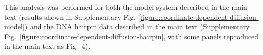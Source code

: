 \documentclass[aps,prl,twocolumn,superscriptaddress,floatfix]{revtex4-1}
\begin{document}
This analysis was performed for both the model system described in the main text (results shown in Supplementary Fig.~\ref{figure:coordinate-dependent-diffusion-model}) and the DNA hairpin data described in the main text (Supplementary Fig.~\ref{figure:coordinate-dependent-diffusion-hairpin}, with some panels reproduced in the main text as Fig.~4).

\begin{figure}[tbp]


\end{figure}
\end{document}
